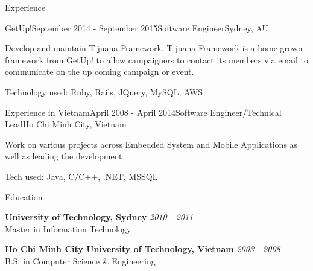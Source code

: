 \documentclass[
	11pt, %
]{banguyen-medium-length} %
\begin{document}
\begin{rSection}{Experience}
	\begin{rSubsection}{GetUp!}{September 2014 - September 2015}{Software Engineer}{Sydney, AU}
		\item Develop and maintain Tijuana Framework. Tijuana Framework is a home grown framework from GetUp! to allow
			campaigners to contact its members via email to communicate on the up
			coming campaign or event.
		\item Technology used: Ruby, Rails, JQuery, MySQL, AWS
	\end{rSubsection}

	\begin{rSubsection}{Experience in Vietnam}{April 2008 - April 2014}{Software
		Engineer/Technical Lead}{Ho Chi Minh City, Vietnam}

		\item Work on various projects across Embedded System and Mobile Applications as well
			as leading the development
		\item Tech used: Java, C/C++, .NET, MSSQL
	\end{rSubsection}

\end{rSection}


\begin{rSection}{Education}

	\textbf{University of Technology, Sydney} \hfill \textit{2010 - 2011} \\
	Master in Information Technology

	\textbf{Ho Chi Minh City University of Technology, Vietnam} \hfill \textit{2003 - 2008} \\
	B.S. in Computer Science \& Engineering \\

\end{rSection}






\end{document}
